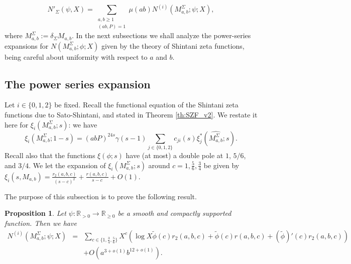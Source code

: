 \documentclass{article}
\def\R{{\mathbb R}}
\newtheorem{proposition}[theorem]{Proposition}
\begin{document}
\begin{equation}\label{eq:mainsievesetup}
    N'_{\Sigma}(\psi,X)=\sum_{\substack{a,b\geq 1\\ (ab,P)=1}}\mu(ab)N^{(i)}(M^{\Sigma}_{a,b};\psi;X),
\end{equation}
where $M^{\Sigma}_{a,b}:=\delta_\Sigma M_{a,b}$. In the next subsections we shall analyze the power-series expansions for $N(M^{\Sigma}_{a,b};\phi;X)$ given by the theory of Shintani zeta functions, being careful about uniformity with respect to $a$ and $b$.

\subsection{The power series expansion}

Let $i\in\{0,1,2\}$ be fixed. Recall the functional equation of the Shintani zeta functions due to Sato-Shintani, and stated in Theorem \ref{th:SZF_v2}. We restate it here for $\xi_i(M_{a,b}^\Sigma;s)$: we have
\begin{equation}\label{eq:funceq_M}
\xi_i(M^{\Sigma}_{a,b};1-s)=(abP)^{24s}\gamma(s-1)\sum_{j\in\{0,1,2\}}c_{ji}(s)\xi^*_j(\widehat{M^{\Sigma}_{a,b}};s).
\end{equation}
Recall also that the functions $\xi(\phi;s)$ have (at most) a double pole at $1$, $5/6$, and $3/4$. We let the expansion of $\xi_i(M^{\Sigma}_{a,b};s)$ around $c=1,\frac56,\frac34$ be given by $\xi_i(s,M_{a,b})=\frac{r_2(a,b,c)}{(s-c)^2}+\frac{r(a,b,c)}{s-c} + O(1)$. 

The purpose of this subsection is to prove the following result.
\begin{proposition}\label{prop:residueexpansion}
Let $\psi:\R_{>0}\to\R_{\geq 0}$ be a smooth and compactly supported function. Then we have
\begin{equation*}
\begin{array}{rcl}
N^{(i)}(M^\Sigma_{a,b};\psi;X)&=&\displaystyle\sum_{c\in \{1,\frac34,\frac56\}}X^c\left(\log X\tilde{\phi}(c)r_2(a,b,c)+\tilde{\phi}(c)r(a,b,c)+(\tilde{\phi})'(c)r_2(a,b,c) \right)
\\[.2in]&&\displaystyle
+ O(a^{3+o(1)}b^{12+o(1)}).
\end{array}
\end{equation*}
\end{proposition}
\end{document}
